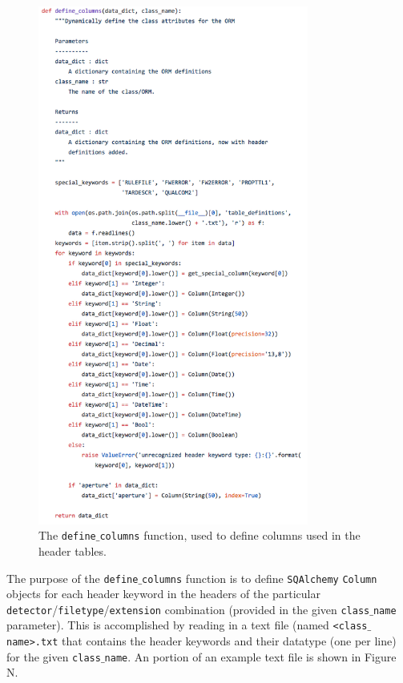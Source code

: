 \documentclass[10pt,journal,compsoc]{IEEEtran}
\begin{document}
\begin{figure}[!t]
\centering
\includegraphics[width=3.5in]{./figures/define_columns.png}
\caption{The \texttt{define$\_$columns} function, used to define columns used in the header tables.}
\label{fig1}
\end{figure}

The purpose of the \texttt{define$\_$columns} function is to define \texttt{SQAlchemy} \texttt{Column}
objects for each header keyword in the headers of the particular \texttt{detector}/\texttt{filetype}/\texttt{extension}
combination (provided in the given \texttt{class$\_$name} parameter).  This is accomplished by reading in a text
file (named \texttt{<class$\_$name>.txt} that contains the header keywords and their datatype (one per line) for
the given \texttt{class$\_$name}. An portion of an example text file is shown in Figure N.
\end{document}
